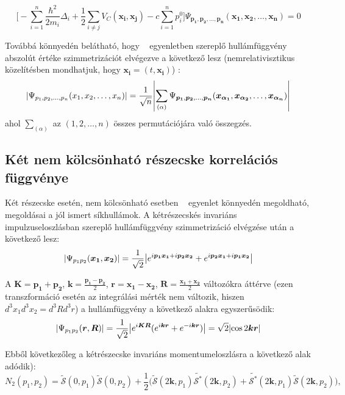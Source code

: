 \documentclass[10pt,a4paper]{article}
\numberwithin{equation}{subsection}
\numberwithin{figure}{section}
\begin{document}
\begin{equation}
\Bigg[-\sum_{i=1}^{n}\frac{\hbar^2}{2m_i}\Delta_i + \frac{1}{2}\sum_{i\neq j} V_C(\bm{x_i},\bm{x_j})  
 - c\sum_{i=1}^n p_i^0
 \Bigg]\Psi_{\bm{p_1}, \bm{p_2}, \dots, \bm{p_n}}(\bm{x_1}, \bm{x_2}, \dots, \bm{x_n}) = 0
\end{equation}

Továbbá könnyedén belátható, hogy ~ egyenletben szereplő hullámfüggvény abszolút értéke szimmetrizációt elvégezve a következő lesz  (nemrelativisztikus közelítésben mondhatjuk, hogy $\bm{x_i} = (t,\bm{x_i})$) :
\begin{equation}
\abs{\Psi_{{p_1},{p_2}, \dots,{p_n}}({x_1}, {x_2}, \dots, {x_n})} = \frac{1}{\sqrt{n}}\abs{\sum_{(\alpha)}\Psi_{\bm{p_1}, \bm{p_2}, \dots, \bm{p_n}}(\bm{x_{\alpha_1}}, \bm{x_{\alpha_2}}, \dots, \bm{x_{\alpha_n}})}
\label{eq:Psin}
\end{equation}
ahol $\sum_{(\alpha)}$ az $(1,2,\dots,n)$ összes permutációjára való összegzés.


\subsection{Két nem kölcsönható részecske korrelációs függvénye}

Két részecske esetén, nem kölcsönható esetben ~ egyenlet könnyedén megoldható, megoldásai a jól ismert síkhullámok. A kétrészecskés invariáns impulzuseloszlásban szereplő hullámfüggvény szimmetrizáció elvégzése után a következő lesz:
\begin{equation}
\abs{\Psi_{{p_1}{p_2}}(\bm{x_1},\bm{x_2})} = \frac{1}{\sqrt{2}}\abs{e^{i\bm{p_1x_1}+i\bm{p_2x_2}}+e^{i\bm{p_2x_1}+i\bm{p_1x_2}}}
\end{equation}

A $\bm{K}=\bm{p_1+p_2}$, $\bm{k}=\frac{\bm{p_1-p_2}}{2}$, $\bm{r}=\bm{x_1-x_2}$, $\bm{R}=\frac{\bm{x_1+x_2}}{2}$ változókra áttérve (ezen transzformáció esetén az integrálási mérték nem változik, hiszen $d^3x_1d^3x_2=d^3Rd^3r$) a hullámfüggvény a következő alakra egyszerűsödik:
\begin{equation}
\abs{\Psi_{{p_1}{p_2}}(\bm{r},\bm{R})} = \frac{1}{\sqrt{2}}\abs{e^{i\bm{KR}}(e^{i\bm{kr}}+e^{-i\bm{kr}})}=\sqrt{2}\abs{\cos{2\bm{kr}}}
\end{equation}

Ebből következőleg a kétrészecske invariáns momentumeloszlásra a következő alak adódik):
\begin{equation}
N_2({p_1},{p_2})=\tilde{\mathcal{S}}(0, {p_1})\tilde{\mathcal{S}}(0, {p_2})+\frac{1}{2}\big(\tilde{\mathcal{S}}(2\bm{k}, {p_1})\tilde{\mathcal{S^*}}(2\bm{k}, {p_2})+\tilde{\mathcal{S^*}}(2\bm{k},{ p_1})\tilde{\mathcal{S}}(2\bm{k}, {p_2})\big),
\end{equation}
\end{document}
